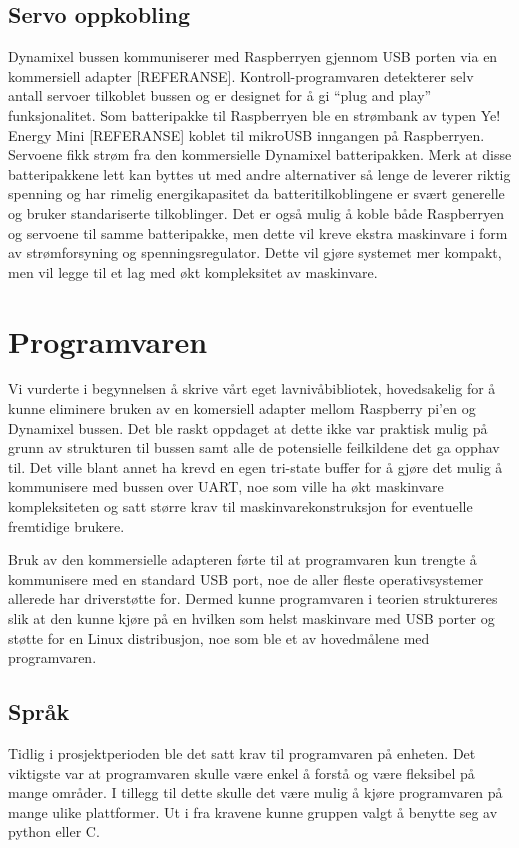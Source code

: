 \documentclass[12pt]{report}
\begin{document}
\subsection{Servo oppkobling}
Dynamixel bussen kommuniserer med Raspberryen gjennom USB porten via en kommersiell adapter [REFERANSE]. Kontroll-programvaren detekterer selv antall servoer tilkoblet bussen og er designet for å gi “plug and play” funksjonalitet. Som batteripakke til Raspberryen ble en strømbank av typen Ye! Energy Mini [REFERANSE] koblet til mikroUSB inngangen på Raspberryen. Servoene fikk strøm fra den kommersielle Dynamixel batteripakken. Merk at disse batteripakkene lett kan byttes ut med andre alternativer så lenge de leverer riktig spenning og har rimelig energikapasitet da batteritilkoblingene er svært generelle og bruker standariserte tilkoblinger. Det er også mulig å koble både Raspberryen og servoene til samme batteripakke, men dette vil kreve ekstra maskinvare i form av strømforsyning og spenningsregulator. Dette vil gjøre systemet mer kompakt, men vil legge til et lag med økt kompleksitet av maskinvare.

\section{Programvaren}
Vi vurderte i begynnelsen å skrive vårt eget lavnivåbibliotek, hovedsakelig for å kunne eliminere bruken av en komersiell adapter mellom Raspberry pi’en og Dynamixel bussen. Det ble raskt oppdaget at dette ikke var praktisk mulig på grunn av strukturen til bussen samt alle de potensielle feilkildene det ga opphav til. Det ville blant annet ha krevd en egen tri-state buffer for å gjøre det mulig å kommunisere med bussen over UART, noe som ville ha økt maskinvare kompleksiteten og satt større krav til maskinvarekonstruksjon for eventuelle fremtidige brukere.

Bruk av den kommersielle adapteren førte til at programvaren kun trengte å kommunisere med en standard USB port, noe de aller fleste operativsystemer allerede har driverstøtte for. Dermed kunne programvaren i teorien struktureres slik at den kunne kjøre på en hvilken som helst maskinvare med USB porter og støtte for en Linux distribusjon, noe som ble et av hovedmålene med programvaren.

\subsection{Språk}
Tidlig i prosjektperioden ble det satt krav til programvaren på enheten. Det viktigste var at programvaren skulle være enkel å forstå og være fleksibel på mange områder. I tillegg til dette skulle det være mulig å kjøre programvaren på mange ulike plattformer. Ut i fra kravene kunne gruppen valgt å benytte seg av python eller C. 
\end{document}
